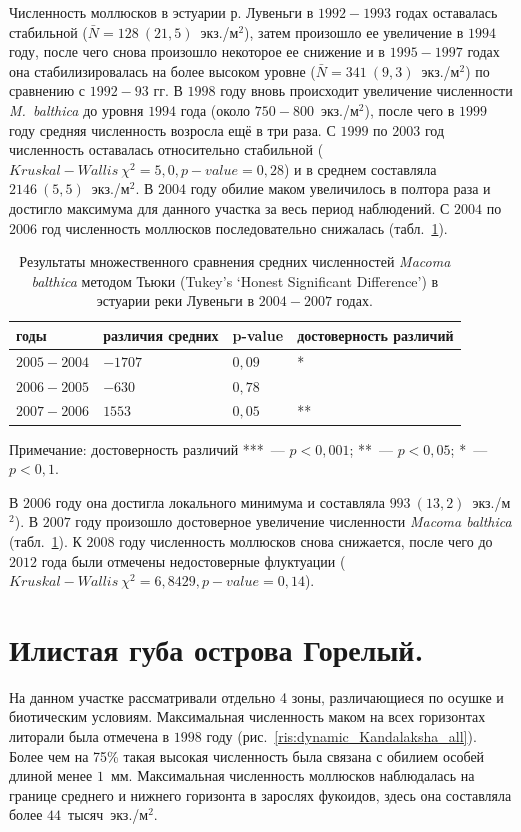 Численность моллюсков в эстуарии р. Лувеньги в $1992-1993$ годах оставалась стабильной ($\bar{N} = 128~(21,5)$~экз./м$^2$), затем произошло ее увеличение в $1994$ году, после чего снова произошло некоторое ее снижение и в $1995 - 1997$ годах она стабилизировалась на более высоком уровне ($\bar{N} = 341~(9,3)$~экз./м$^2$) по сравнению с $1992 - 93$ гг.
В $1998$ году вновь происходит увеличение численности {\it M.~balthica} до уровня $1994$ года (около $750 - 800$~экз./м$^2$), после чего в $1999$ году средняя численность возросла ещё в три раза.
С $1999$ по $2003$ год численность оставалась относительно стабильной  ($Kruskal-Wallis\ \chi^2 = 5,0, p-value = 0,28$) и в среднем составляла $2146~(5,5)$~экз./м$^2$.
В $2004$ году обилие маком увеличилось в полтора раза и достигло максимума для данного участка за весь период наблюдений. 
С $2004$ по $2006$ год численность моллюсков последовательно снижалась (табл.~\ref {tab:Tukey_estuary_04_07_n2}). 
	\begin{table}[p]
	\caption{Результаты множественного сравнения средних численностей {\it Macoma balthica} методом Тьюки (Tukey's ‘Honest Significant Difference’) в эстуарии реки Лувеньги в $2004-2007$ годах.}
	\label{tab:Tukey_estuary_04_07_n2}
	\begin{tabularx}{\textwidth}{|*{4}{X|}} \hline
	годы & различия средних & p-value & достоверность различий\\
	\hline
	$2005-2004$ & $-1707$ & $0,09$ & *\\
	\hline
	$2006-2005$ & $-630$ & $0,78$ & \\
	\hline
	$2007-2006$ & $1553$ & $0,05$ & **\\
	\hline
	\end{tabularx}

	{\footnotesize Примечание: достоверность различий ***~--- $p<0,001$; **~--- $p<0,05$; *~--- $p<0,1$.}
	\end{table}
В $2006$ году она достигла локального минимума и составляла $993~(13,2)$~экз./м$^2$). 
В $2007$ году произошло достоверное увеличение численности {\it Macoma balthica} (табл.~\ref {tab:Tukey_estuary_04_07_n2}).
К $2008$ году численность моллюсков снова снижается, после чего до $2012$ года были отмечены недостоверные флуктуации ($Kruskal-Wallis\ \chi^2 = 6,8429, p-value = 0,14$).

		\section{Илистая губа острова Горелый.}
На данном участке рассматривали отдельно 4 зоны, различающиеся по осушке и биотическим условиям. 
Максимальная численность маком на всех горизонтах литорали была отмечена в $1998$ году (рис.~\ref{ris:dynamic_Kandalaksha_all}).
Более чем на 75\% такая высокая численность была связана с обилием особей длиной менее $1$~мм.
Максимальная численность моллюсков наблюдалась на границе среднего и нижнего горизонта в зарослях фукоидов, здесь она составляла более $44$~тысяч~экз./м$^2$.

